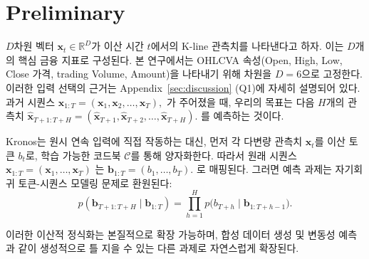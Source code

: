 \section{Preliminary}

\(D\)차원 벡터 \(\mathbf{x}_t \in \mathbb{R}^D\)가 이산 시간 \(t\)에서의 K-line 관측치를 나타낸다고 하자. 이는 \(D\)개의 핵심 금융 지표로 구성된다. 본 연구에서는 OHLCVA 속성(Open, High, Low, Close 가격, trading Volume, Amount)을 나타내기 위해 차원을 \(D=6\)으로 고정한다. 이러한 입력 선택의 근거는 Appendix~\ref{sec:discussion} (Q1)에 자세히 설명되어 있다. 과거 시퀀스
\(
\mathbf{x}_{1:T} = (\mathbf{x}_1, \mathbf{x}_2, \ldots, \mathbf{x}_T),
\)
가 주어졌을 때, 우리의 목표는 다음 \(H\)개의 관측치
\(
\hat{\mathbf{x}}_{T+1:T+H} = (\hat{\mathbf{x}}_{T+1}, \hat{\mathbf{x}}_{T+2}, \ldots, \hat{\mathbf{x}}_{T+H}).
\)
를 예측하는 것이다.

Kronos는 원시 연속 입력에 직접 작동하는 대신, 먼저 각 다변량 관측치 \(\mathbf{x}_t\)를 이산 토큰 \(b_t\)로, 학습 가능한 코드북 \(\mathcal{C}\)를 통해 양자화한다.
따라서 원래 시퀀스
\(
\mathbf{x}_{1:T} = (\mathbf{x}_1, \dots, \mathbf{x}_T)
\)
는
\(
\mathbf{b}_{1:T} = (b_1, \dots, b_T).
\)
로 매핑된다. 그러면 예측 과제는 자기회귀 토큰-시퀀스 모델링 문제로 환원된다:
\begin{equation}
\label{eq:ts_ar}
p(\mathbf{b}_{T+1:T+H} \mid \mathbf{b}_{1:T})
= \prod_{h=1}^{H} p\bigl(b_{T+h} \mid \mathbf{b}_{1:T+h-1}\bigr).
\end{equation}

이러한 이산적 정식화는 본질적으로 확장 가능하며, 합성 데이터 생성 및 변동성 예측과 같이 생성적으로 틀 지을 수 있는 다른 과제로 자연스럽게 확장된다.

